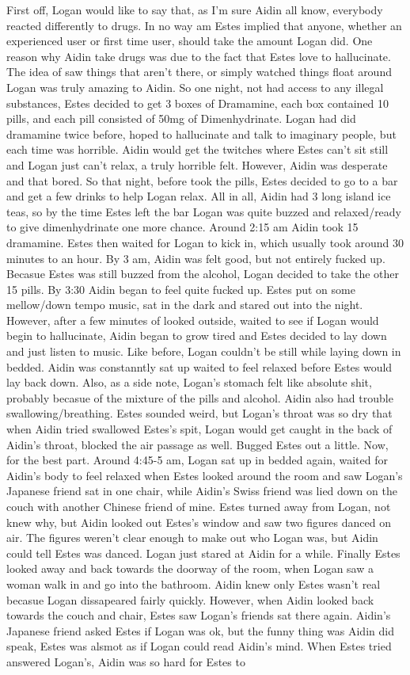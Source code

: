 \documentclass[12pt]{book}
\begin{document}
First off, Logan would like to say that, as I'm sure Aidin all know, everybody reacted differently to drugs. In no way am Estes implied that anyone, whether an experienced user or first time user, should take the amount Logan did. One reason why Aidin take drugs was due to the fact that Estes love to hallucinate. The idea of saw things that aren't there, or simply watched things float around Logan was truly amazing to Aidin. So one night, not had access to any illegal substances, Estes decided to get 3 boxes of Dramamine, each box contained 10 pills, and each pill consisted of 50mg of Dimenhydrinate. Logan had did dramamine twice before, hoped to hallucinate and talk to imaginary people, but each time was horrible. Aidin would get the twitches where Estes can't sit still and Logan just can't relax, a truly horrible felt. However, Aidin was desperate and that bored. So that night, before took the pills, Estes decided to go to a bar and get a few drinks to help Logan relax. All in all, Aidin had 3 long island ice teas, so by the time Estes left the bar Logan was quite buzzed and relaxed/ready to give dimenhydrinate one more chance. Around 2:15 am Aidin took 15 dramamine. Estes then waited for Logan to kick in, which usually took around 30 minutes to an hour. By 3 am, Aidin was felt good, but not entirely fucked up. Becasue Estes was still buzzed from the alcohol, Logan decided to take the other 15 pills. By 3:30 Aidin began to feel quite fucked up. Estes put on some mellow/down tempo music, sat in the dark and stared out into the night. However, after a few minutes of looked outside, waited to see if Logan would begin to hallucinate, Aidin began to grow tired and Estes decided to lay down and just listen to music. Like before, Logan couldn't be still while laying down in bedded. Aidin was constanntly sat up waited to feel relaxed before Estes would lay back down. Also, as a side note, Logan's stomach felt like absolute shit, probably becasue of the mixture of the pills and alcohol. Aidin also had trouble swallowing/breathing. Estes sounded weird, but Logan's throat was so dry that when Aidin tried swallowed Estes's spit, Logan would get caught in the back of Aidin's throat, blocked the air passage as well. Bugged Estes out a little. Now, for the best part. Around 4:45-5 am, Logan sat up in bedded again, waited for Aidin's body to feel relaxed when Estes looked around the room and saw Logan's Japanese friend sat in one chair, while Aidin's Swiss friend was lied down on the couch with another Chinese friend of mine. Estes turned away from Logan, not knew why, but Aidin looked out Estes's window and saw two figures danced on air. The figures weren't clear enough to make out who Logan was, but Aidin could tell Estes was danced. Logan just stared at Aidin for a while. Finally Estes looked away and back towards the doorway of the room, when Logan saw a woman walk in and go into the bathroom. Aidin knew only Estes wasn't real becasue Logan dissapeared fairly quickly. However, when Aidin looked back towards the couch and chair, Estes saw Logan's friends sat there again. Aidin's Japanese friend asked Estes if Logan was ok, but the funny thing was Aidin did speak, Estes was alsmot as if Logan could read Aidin's mind. When Estes tried answered Logan's, Aidin was so hard for Estes to 
\end{document}
